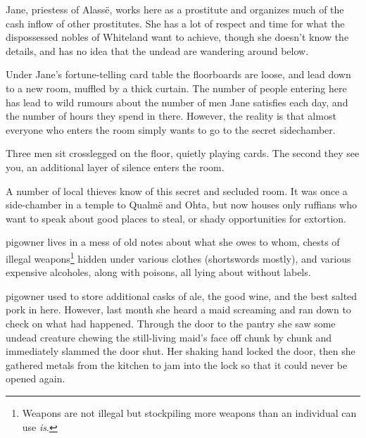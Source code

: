 Jane, priestess of Alass\"{e}, works here as a prostitute and organizes much of the cash inflow of other prostitutes.  She has a lot of respect and time for what the dispossessed nobles of Whiteland want to achieve, though she doesn't know the details, and has no idea that the undead are wandering around below.




Under Jane's fortune-telling card table the floorboards are loose, and lead down to a new room, muffled by a thick curtain.  The number of people entering here has lead to wild rumours about the number of men Jane satisfies each day, and the number of hours they spend in there.  However, the reality is that almost everyone who enters the room simply wants to go to the secret sidechamber.


\begin{boxtext}
	Three men sit crosslegged on the floor, quietly playing cards.  The second they see you, an additional layer of silence enters the room.
\end{boxtext}

A number of local thieves know of this secret and secluded room.  It was once a side-chamber in a temple to Qualm\"{e} and Ohta, but now houses only ruffians who want to speak about good places to steal, or shady opportunities for extortion.


\humanthief


\Gls{pigowner} lives in a mess of old notes about what she owes to whom, chests of illegal weapons\footnote{Weapons are not illegal but stockpiling more weapons than an individual can use \emph{is}.} hidden under various clothes (shortswords mostly), and various expensive alcoholes, along with poisons, all lying about without labels.


\Gls{pigowner} used to store additional casks of ale, the good wine, and the best salted pork in here.  However, last month she heard a maid screaming and ran down to check on what had happened.  Through the door to the pantry she saw some undead creature chewing the still-living maid's face off chunk by chunk and immediately slammed the door shut.  Her shaking hand locked the door, then she gathered metals from the kitchen to jam into the lock so that it could never be opened again.

